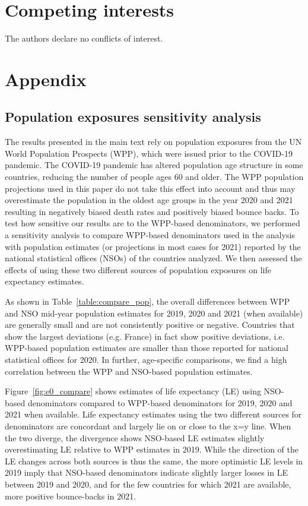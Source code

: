\documentclass[12pt]{article}
\begin{document}
\section*{Competing interests}

The authors declare no conflicts of interest.

\clearpage
\section*{Appendix}

\subsection*{Population exposures sensitivity analysis}

The results presented in the main text rely on population exposures from the UN World Population Prospects (WPP), which were issued prior to the COVID-19 pandemic. The COVID-19 pandemic has altered population age structure in some countries, reducing the number of people ages 60 and older. The WPP population projections used in this paper do not take this effect into account and thus may overestimate the population in the oldest age groups in the year 2020 and 2021 resulting in negatively biased death rates and positively biased bounce backs. To test how sensitive our results are to the WPP-based denominators, we performed a sensitivity analysis to compare WPP-based denominators used in the analysis with population estimates (or projections in most cases for 2021) reported by the national statistical offices (NSOs) of the countries analyzed. We then assessed the effects of using these two different sources of population exposures on life expectancy estimates.

As shown in Table~\ref{table:compare_pop}, the overall differences between WPP and NSO mid-year population estimates for 2019, 2020 and 2021 (when available) are generally small and are not consistently positive or negative. Countries that show the largest deviations (e.g. France) in fact show positive deviations, i.e. WPP-based population estimates are smaller than those reported for national statistical offices for 2020. In further, age-specific comparisons, we find a high correlation between the WPP and NSO-based population estimates.

Figure~\ref{fig:e0_compare} shows estimates of life expectancy (LE) using NSO-based denominators compared to WPP-based denominators for 2019, 2020 and 2021 when available. Life expectancy estimates using the two different sources for denominators are concordant and largely lie on or close to the x=y line. When the two diverge, the divergence shows NSO-based LE estimates slightly overestimating LE relative to WPP estimates in 2019. While the direction of the LE changes across both sources is thus the same, the more optimistic LE levels in 2019 imply that NSO-based denominators indicate slightly larger losses in LE between 2019 and 2020, and for the few countries for which 2021 are available, more positive bounce-backs in 2021.
\end{document}
